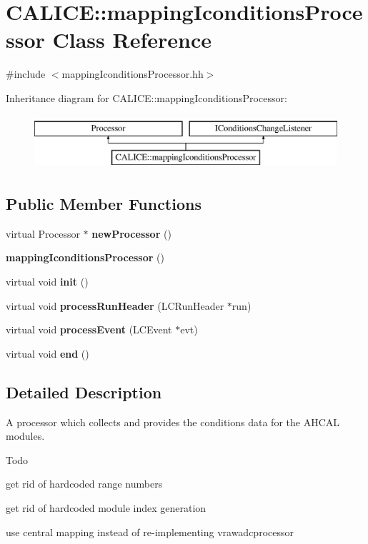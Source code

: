 \section{C\-A\-L\-I\-C\-E\-:\-:mapping\-Iconditions\-Processor Class Reference}
\label{classCALICE_1_1mappingIconditionsProcessor}


{\ttfamily \#include $<$mapping\-Iconditions\-Processor.\-hh$>$}

Inheritance diagram for C\-A\-L\-I\-C\-E\-:\-:mapping\-Iconditions\-Processor\-:\begin{figure}[H]
\begin{center}
\leavevmode
\includegraphics[height=2.000000cm]{classCALICE_1_1mappingIconditionsProcessor}
\end{center}
\end{figure}
\subsection*{Public Member Functions}
\begin{DoxyCompactItemize}
\item 
virtual Processor $\ast$ {\bf new\-Processor} ()
\item 
{\bf mapping\-Iconditions\-Processor} ()
\item 
virtual void {\bf init} ()
\item 
virtual void {\bf process\-Run\-Header} (L\-C\-Run\-Header $\ast$run)
\item 
virtual void {\bf process\-Event} (L\-C\-Event $\ast$evt)
\item 
virtual void {\bf end} ()
\end{DoxyCompactItemize}


\subsection{Detailed Description}
A processor which collects and provides the conditions data for the A\-H\-C\-A\-L modules.

\begin{DoxyRefDesc}{Todo}
\item[{\bf Todo}]
\begin{DoxyItemize}
\item get rid of hardcoded range numbers
\item get rid of hardcoded module index generation
\item use central mapping instead of re-\/implementing vrawadcprocessor
\end{DoxyItemize}\end{DoxyRefDesc}



